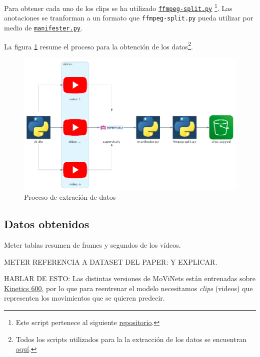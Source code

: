 Para obtener cada uno de los clips se ha utilizado \href{https://github.com/plaguss/tfm-misc/blob/main/scripts/ffmpeg-split.py}{\texttt{ffmpeg-split.py}} \footnote{Este script pertenece al siguiente \href{https://github.com/c0decracker/video-splitter}{repositorio}.}. Las anotaciones se tranforman a un formato que \texttt{ffmpeg-split.py} pueda utilizar por medio de \href{https://github.com/plaguss/tfm-misc/blob/main/scripts/manifester.py}{\texttt{manifester.py}}.

La figura \ref{data_extraction_process} resume el proceso para la obtención de los datos\footnote{Todos los scripts utilizados para la la extracción de los datos se encuentran \href{https://github.com/plaguss/tfm-misc/tree/main/scripts}{aquí}.}.


\begin{figure}[H]
    \centering
		\includegraphics[width=\textwidth]{figs/data_extraction_process_.png}
\caption{Proceso de extración de datos}\label{data_extraction_process}
\end{figure}

\subsection{Datos obtenidos}

Meter tablas resumen de frames y segundos de los vídeos.



METER REFERENCIA A DATASET DEL PAPER: \cite{UCF101} Y EXPLICAR.

HABLAR DE ESTO:
Las distintas versiones de MoViNets están entrenadas sobre \href{https://www.deepmind.com/open-source/kinetics}{Kinetics 600}, por lo que para reentrenar el modelo necesitamos \textit{clips} (videos) que representen los movimientos que se quieren predecir.


